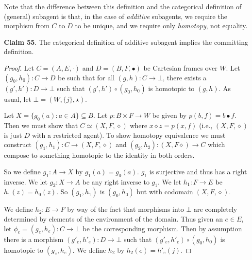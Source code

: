 \documentclass{article}
\begin{document}
\bigskip
\noindent Note that the difference between this definition and the categorical definition of (general) subagent is that, in the case of \emph{additive} subagents, we require the morphism from $C$ to $D$ to be unique, and we require only \emph{homotopy}, not equality.

\bigskip
\noindent \textbf{Claim 55}.
The categorical definition of additive subagent implies the committing definition.

\begin{proof}
Let $C = (A, E, \cdot)$ and $D = (B, F, \bullet)$ be Cartesian frames over $W$.
Let $(g_0, h_0) : C \to D$ be such that for all $(g, h): C \to \bot$, there exists a $(g', h'):D \to \bot$ such that $(g', h') \circ (g_0, h_0)$ is homotopic to $(g, h)$.
As usual, let $\bot = (W, \{j\}, \star)$.

Let $X = \{g_0(a) : a \in A\} \subseteq B$.
Let $p : B \times F \to W$ be given by $p(b, f) = b \bullet f$.
Then we must show that $C \simeq (X, F, \diamond)$ where $x \diamond z = p(x, f)$ (i.e., $(X, F, \diamond)$ is just $D$ with a restricted agent).
To show homotopy equivalence we must construct $(g_1, h_1) : C \to (X, F, \diamond)$ and $(g_2, h_2): (X, F \diamond) \to C$ which compose to something homotopic to the identity in both orders.

So we define $g_1 : A \to X$ by $g_1(a) = g_0(a)$.
$g_1$ is surjective and thus has a right inverse.
We let $g_2: X \to A$ be any right inverse to $g_1$.
We let $h_1 : F \to E$ be $h_1(z) = h_0(z)$.
So $(g_1, h_1)$ is $(g_0, h_0)$ but with codomain $(X, F, \diamond)$.

We define $h_2: E \to F$ by way of the fact that morphisms into $\bot$ are completely determined by elements of the environment of the domain.
Thus given an $e \in E$, let $\phi_e = (g_e, h_e) : C \to \bot$ be the corresponding morphism.
Then by assumption there is a morphism $(g'_e, h'_e): D \to \bot$ such that $(g'_e, h'_e) \circ (g_0, h_0)$ is homotopic to $(g_e, h_e)$.
We define $h_2$ by $h_2(e) = h'_e (j)$.


\end{proof}
\end{document}
